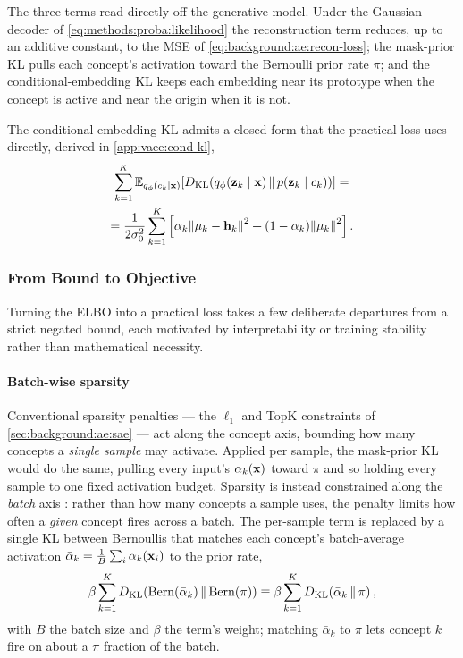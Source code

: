 The three terms read directly off the generative model. Under the Gaussian
decoder of \cref{eq:methods:proba:likelihood} the reconstruction term reduces,
up to an additive constant, to the \ac{MSE} of
\cref{eq:background:ae:recon-loss}; the mask-prior \ac{KL} pulls each concept's
activation toward the Bernoulli prior rate $\pi$; and the conditional-embedding
\ac{KL} keeps each embedding near its prototype when the concept is active and
near the origin when it is not.

The conditional-embedding \ac{KL} admits a closed form that the practical loss
uses directly, derived in \cref{app:vaee:cond-kl},
\begin{multline} \label{eq:methods:loss:cond-kl}
    \sum_{k=1}^{K} \E[q_\phi(c_k \mid \vb{x})]{\KL{q_\phi(\vb{z}_k \mid \vb{x})}{p(\vb{z}_k \mid c_k)}} =\\
    = \frac{1}{2\sigma_0^2} \sum_{k=1}^{K} \left[ \alpha_k \norm{\vb{\mu}_k - \vb{h}_k}^2 + (1 - \alpha_k) \norm{\vb{\mu}_k}^2 \right].
\end{multline}

\subsubsection{From Bound to Objective}
Turning the \ac{ELBO} into a practical loss takes a few deliberate departures
from a strict negated bound, each motivated by interpretability or training
stability rather than mathematical necessity.

    \paragraph{Batch-wise sparsity} Conventional sparsity penalties --- the
    $\ell_1$ and TopK constraints of \cref{sec:background:ae:sae}
    --- act along the concept axis, bounding how many concepts a \textit{single
    sample} may activate. Applied per sample, the mask-prior \ac{KL} would do
    the same, pulling every input's $\alpha_k(\vb{x})$ toward $\pi$
    and so holding every sample to one fixed activation budget.
    Sparsity is instead constrained along the \textit{batch} axis
    \citep{desantisBetterGeneralizationInterpretability2025}: rather than how
    many concepts a sample uses, the penalty limits how often a \textit{given}
    concept fires across a batch. The per-sample term is replaced by a single \ac{KL}
    between Bernoullis that matches each concept's batch-average activation
    $\bar{\alpha}_k = \frac{1}{B} \sum_{i} \alpha_k(\vb{x}_i)$ to the prior
    rate,
    \begin{equation*}
        \beta \sum_{k=1}^{K} \KL{\on{Bern}(\bar{\alpha}_{k})}{\on{Bern}(\pi)} \equiv 
        \beta \sum_{k=1}^{K} \KL{\bar{\alpha}_{k}}{\pi},
    \end{equation*}
    with $B$ the batch size and $\beta$ the term's weight; matching
    $\bar{\alpha}_k$ to $\pi$ lets concept $k$ fire on about a $\pi$ fraction of
    the batch.

